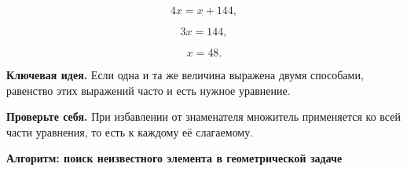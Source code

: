 \documentclass[a4paper,12pt]{article}
\newcommand{\keyidea}[1]{%
    \par\noindent
    {\color{darkaccent}\textbf{Ключевая идея.}} #1\par
}
\newcommand{\warning}[1]{%
    \par\noindent
    {\color{darkaccent}\textbf{Проверьте себя.}} #1\par
}
\begin{document}
\[
4x=x+144,
\]

\[
3x=144,
\]

\[
\boxed{x=48}.
\]

\keyidea{Если одна и та же величина выражена двумя способами, равенство этих
выражений часто и есть нужное уравнение.}

\warning{При избавлении от знаменателя множитель применяется ко всей части
уравнения, то есть к каждому её слагаемому.}

\clearpage
\thispagestyle{empty}

\begin{center}
{\Large\bfseries\color{darkaccent}
Алгоритм: поиск неизвестного элемента в геометрической задаче}
\end{center}

\vspace{7mm}
\end{document}
